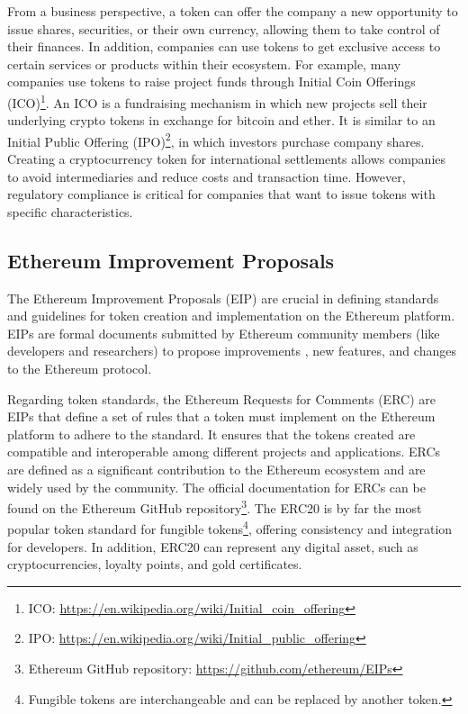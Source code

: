 From a business perspective, a token can offer the company a new opportunity to issue shares, securities, or their own
currency, allowing them to take control of their finances. In addition, companies can use tokens to get exclusive access to certain services
or products within their ecosystem. For example, many companies use tokens to raise project funds through Initial Coin Offerings (ICO)\footnote{ICO: \url{https://en.wikipedia.org/wiki/Initial_coin_offering}}.
An ICO is a fundraising mechanism in which new projects sell their underlying crypto tokens in exchange for bitcoin and ether. It is
similar to an Initial Public Offering (IPO)\footnote{IPO: \url{https://en.wikipedia.org/wiki/Initial_public_offering}},
 in which investors purchase company shares. Creating a cryptocurrency token for
international settlements allows companies to avoid intermediaries and reduce costs and transaction time. However, regulatory compliance is
critical for companies that want to issue tokens with specific characteristics.



\subsection{Ethereum Improvement Proposals}
\label{subsec:eip}

The Ethereum Improvement Proposals (EIP) are crucial in defining standards and guidelines for token creation and implementation on the Ethereum
platform. EIPs are formal documents submitted by Ethereum community members (like developers and researchers) to propose improvements
, new features, and changes to the Ethereum protocol.


Regarding token standards, the Ethereum Requests for Comments (ERC) are EIPs that define a set of rules that a token must implement on the Ethereum
platform to adhere to the standard. It ensures that the tokens created are compatible and interoperable among different projects and applications.
ERCs are defined as a significant contribution to the Ethereum ecosystem and are widely used by the community. The official documentation
for ERCs can be found on the Ethereum GitHub repository\footnote{Ethereum GitHub repository: \url{https://github.com/ethereum/EIPs}}.
The ERC20 is by far the most popular token standard for fungible tokens\footnote{Fungible tokens are interchangeable and can be replaced by another token.},
offering consistency and integration for developers. In addition, ERC20 can represent any digital asset, such as cryptocurrencies, loyalty points, and gold certificates.


